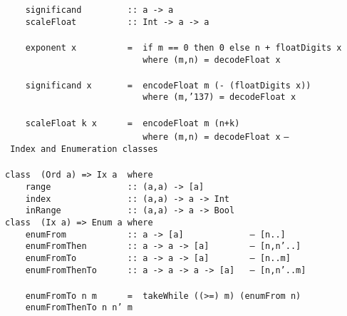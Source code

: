 \mbox{\tt \ \ \ \ significand\ \ \ \ \ \ \ \ \ ::\ a\ ->\ a}\\
\mbox{\tt \ \ \ \ scaleFloat\ \ \ \ \ \ \ \ \ \ ::\ Int\ ->\ a\ ->\ a}\\
\mbox{\tt }\\
\mbox{\tt \ \ \ \ exponent\ x\ \ \ \ \ \ \ \ \ \ =\ \ if\ m\ ==\ 0\ then\ 0\ else\ n\ +\ floatDigits\ x}\\
\mbox{\tt \ \ \ \ \ \ \ \ \ \ \ \ \ \ \ \ \ \ \ \ \ \ \ \ \ \ \ where\ (m,n)\ =\ decodeFloat\ x}\\
\mbox{\tt }\\
\mbox{\tt \ \ \ \ significand\ x\ \ \ \ \ \ \ =\ \ encodeFloat\ m\ (-\ (floatDigits\ x))}\\
\mbox{\tt \ \ \ \ \ \ \ \ \ \ \ \ \ \ \ \ \ \ \ \ \ \ \ \ \ \ \ where\ (m,{\char'137})\ =\ decodeFloat\ x}\\
\mbox{\tt }\\
\mbox{\tt \ \ \ \ scaleFloat\ k\ x\ \ \ \ \ \ =\ \ encodeFloat\ m\ (n+k)}\\
\mbox{\tt \ \ \ \ \ \ \ \ \ \ \ \ \ \ \ \ \ \ \ \ \ \ \ \ \ \ \ where\ (m,n)\ =\ decodeFloat\ x}
\eprogB\noindent\bprogB
\mbox{\tt --\ Index\ and\ Enumeration\ classes}\\
\mbox{\tt }\\
\mbox{\tt class\ \ (Ord\ a)\ =>\ Ix\ a\ \ where}\\
\mbox{\tt \ \ \ \ range\ \ \ \ \ \ \ \ \ \ \ \ \ \ \ ::\ (a,a)\ ->\ [a]}\\
\mbox{\tt \ \ \ \ index\ \ \ \ \ \ \ \ \ \ \ \ \ \ \ ::\ (a,a)\ ->\ a\ ->\ Int}\\
\mbox{\tt \ \ \ \ inRange\ \ \ \ \ \ \ \ \ \ \ \ \ ::\ (a,a)\ ->\ a\ ->\ Bool}
\eprogB\noindent\bprogB
\mbox{\tt class\ \ (Ix\ a)\ =>\ Enum\ a\ where}\\
\mbox{\tt \ \ \ \ enumFrom\ \ \ \ \ \ \ \ \ \ \ \ ::\ a\ ->\ [a]\ \ \ \ \ \ \ \ \ \ \ \ \ --\ [n..]}\\
\mbox{\tt \ \ \ \ enumFromThen\ \ \ \ \ \ \ \ ::\ a\ ->\ a\ ->\ [a]\ \ \ \ \ \ \ \ --\ [n,n'..]}\\
\mbox{\tt \ \ \ \ enumFromTo\ \ \ \ \ \ \ \ \ \ ::\ a\ ->\ a\ ->\ [a]\ \ \ \ \ \ \ \ --\ [n..m]}\\
\mbox{\tt \ \ \ \ enumFromThenTo\ \ \ \ \ \ ::\ a\ ->\ a\ ->\ a\ ->\ [a]\ \ \ --\ [n,n'..m]}\\
\mbox{\tt }\\
\mbox{\tt \ \ \ \ enumFromTo\ n\ m\ \ \ \ \ \ =\ \ takeWhile\ ((>=)\ m)\ (enumFrom\ n)}\\
\mbox{\tt \ \ \ \ enumFromThenTo\ n\ n'\ m}\\
